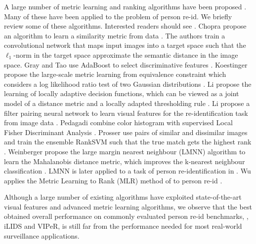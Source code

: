 \documentclass[10pt,twocolumn,letterpaper]{article}
\begin{document}
A large number of metric learning and ranking algorithms
have been proposed \cite{Chopra2005Learning,Davis2007Information,
Frome2007Learning,Kedem2012Nonlinear,Kostinger2012Large,Weinberger2006Distance,
Weinberger2008Fast,Wu2011Optimizing,Xiong2014Person}.
Many of these have been applied to the problem of
person re-id.
We briefly review some of these algorithms.
Interested readers should see \cite{Yang2006Distance}.
Chopra \etal propose an algorithm to learn a similarity metric
from data \cite{Chopra2005Learning}.
The authors train a convolutional network that maps input images into a target
space such that the $\ell_1$-norm in the target space approximate
the semantic distance in the image space.
Gray and Tao use AdaBoost to select discriminative features \cite{Gray2008Viewpoint}.
Koestinger \etal propose the large-scale metric learning
from equivalence constraint
which considers a log likelihood ratio test of two
Gaussian distributions \cite{Kostinger2012Large}.
Li \etal propose the learning of locally adaptive decision functions,
which can be viewed as a joint model of a distance metric
and a locally adapted thresholding rule \cite{Li2013Learning}.
Li \etal propose a filter pairing neural network to learn
visual features for the re-identification task from image data \cite{Li2014Deep}.
Pedagadi \etal combine color histogram with supervised
Local Fisher Discriminant Analysis \cite{Pedagadi2013Local}.
Prosser \etal use pairs of similar and dissimilar images and train the ensemble RankSVM
such that the true match gets the highest rank \cite{Prosser2010Person}.
Weinberger \etal propose the large margin nearest neighbour (LMNN) algorithm to learn the
Mahalanobis distance metric, which improves the k-nearest neighbour classification
\cite{Weinberger2006Distance}.
LMNN is later applied to a task of person re-identification in \cite{Hirzer2012Person}.
Wu \etal applies the Metric Learning to Rank (MLR) method of \cite{McFee2010Metric} to person
re-id \cite{Wu2011Optimizing}.


Although a large number of existing algorithms have
exploited state-of-the-art visual features and
advanced metric learning algorithms,
we observe that the best obtained overall performance on
commonly evaluated person re-id benchmarks, \eg, iLIDS and VIPeR,
is still far from the performance needed for most real-world
surveillance applications.
\end{document}
